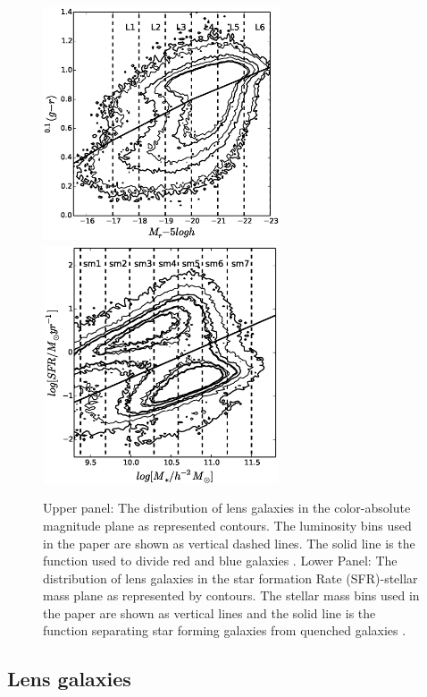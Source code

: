 \documentclass[apj]{emulateapj}
\begin{document}
\begin{figure}
\centering
\includegraphics[width=7cm,height=7cm]{f4a.eps}
\includegraphics[width=7cm,height=7cm]{f4b.eps}
\caption{Upper panel: The distribution of lens galaxies in the 
color-absolute magnitude plane as represented contours.  The
luminosity bins used in the paper are shown as vertical dashed lines.
The solid line is the function used to divide red and blue galaxies 
\citep{Yang2008}.
Lower Panel: The distribution of lens galaxies in the 
star formation Rate (SFR)-stellar mass plane as represented 
by contours.  The stellar mass bins used in the paper are shown 
as vertical lines and the solid line is the function separating star forming 
galaxies from quenched galaxies \citep{Luo2014}.}
\label{fig:sublens}
\end{figure}

\subsection{Lens galaxies}
\end{document}
